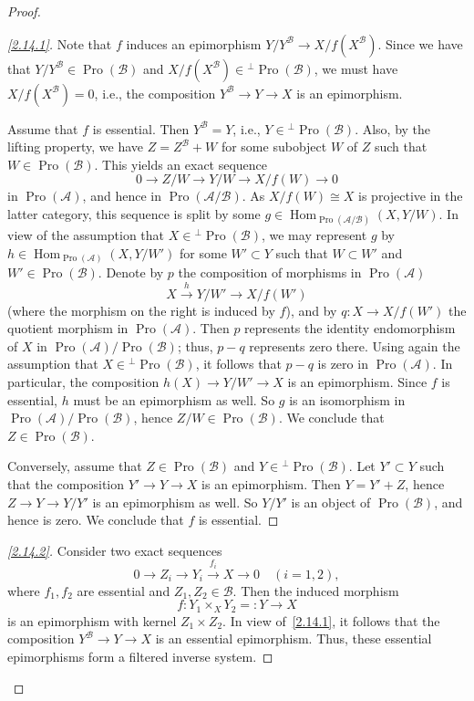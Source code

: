\documentclass[11pt]{article}
\theoremstyle{definition}
\newenvironment{proofc}{\begin{proof}}{\end{proof}}
\numberwithin{equation}{section}
\newcommand\cA{{\mathcal A}}
\newcommand\cB{{\mathcal B}}
\DeclareMathOperator{\Hom}{Hom}
\DeclareMathOperator{\Pro}{Pro}
\newenvironment{step}[1]{\begin{proof}[#1]}{\let\qed\relax\end{proof}}
\newenvironment{laststep}[1]{\begin{proof}[#1]}{\end{proof}}
\renewenvironment{proofc}{\begin{proof}}{\end{proof}}
\theoremstyle{remark}
\begin{document}
\begin{proofc}
\begin{step}{\eqref{2.14.1}}%
Note that $f$ induces an epimorphism $Y/Y^{\cB} \to X/f(X^{\cB})$. Since we have that $Y/Y^{\cB} \in \Pro(\cB)$ and $X/f(X^{\cB})\in {^{\perp} \Pro(\cB)}$, we must have $X/f(X^{\cB}) = 0$, i.e., the composition $Y^{\cB} \to Y \to X$ is an epimorphism.

Assume that $f$ is essential. Then $Y^{\cB} = Y$, i.e., $Y \in {^{\perp} \Pro(\cB)}$. Also, by the lifting property, we have $Z = Z^{\cB} + W$ for some subobject $W$ of $Z$ such that $W \in \Pro(\cB)$. This yields an exact sequence
\[
0 \longrightarrow Z/W \longrightarrow Y/W
\longrightarrow X/f(W) \longrightarrow 0
\]
in $\Pro(\cA)$, and hence in $\Pro(\cA/\cB)$. As $X/f(W) \cong X$ is projective in the latter category, this sequence is split by some $g \in \Hom_{\Pro(\cA/\cB)}(X,Y/W)$. In view of the assumption that $X \in {^{\perp} \Pro(\cB)}$, we may represent $g$ by $h \in \Hom_{\Pro(\cA)}(X,Y/W')$ for some $W' \subset Y$ such that $W \subset W'$ and $W' \in \Pro(\cB)$. Denote by $p$ the composition of morphisms in $\Pro(\cA)$
\[
X \stackrel{h}{\longrightarrow} Y/W' \longrightarrow X/f(W')
\]
(where the morphism on the right is induced by $f$), and by $q : X \to X/f(W')$ the quotient morphism in $\Pro(\cA)$. Then $p$ represents the identity endomorphism of $X$ in $\Pro(\cA)/\Pro(\cB)$; thus, $p - q$ represents zero there. Using again the assumption that $X \in {^{\perp} \Pro(\cB)}$, it follows that $p - q$ is zero in $\Pro(\cA)$. In particular, the composition $h(X) \to Y/W' \to X$ is an epimorphism. Since $f$ is essential, $h$ must be an epimorphism as well. So $g$ is an isomorphism in $\Pro(\cA)/\Pro(\cB)$, hence $Z/W \in \Pro(\cB)$. We conclude that $Z \in \Pro(\cB)$.

Conversely, assume that $Z \in \Pro(\cB)$ and $Y \in {^{\perp} \Pro(\cB)}$. Let $Y' \subset Y$ such that the composition $Y' \to Y \to X$ is an epimorphism. Then $Y = Y' + Z$, hence $Z \to Y \to Y/Y'$ is an epimorphism as well. So $Y/Y'$ is an object of $\Pro(\cB)$, and hence is zero. We conclude that $f$ is essential.
\end{step}

\begin{laststep}{\eqref{2.14.2}}%
Consider two exact sequences
\[
0 \longrightarrow Z_i \longrightarrow Y_i
\stackrel{f_i}{\longrightarrow} X \longrightarrow 0 \quad (i = 1,2),
\]
where $f_1,f_2$ are essential and $Z_1,Z_2 \in \cB$. Then the induced morphism
\[
f : Y_1 \times_X Y_2 =: Y \longrightarrow X
\]
is an epimorphism with kernel $Z_1 \times Z_2$. In view of~\eqref{2.14.1}, it follows that the composition $Y^{\cB} \to Y \to X$ is an essential epimorphism. Thus, these essential epimorphisms form a filtered inverse system.


\end{laststep}
\end{proofc}
\end{document}
